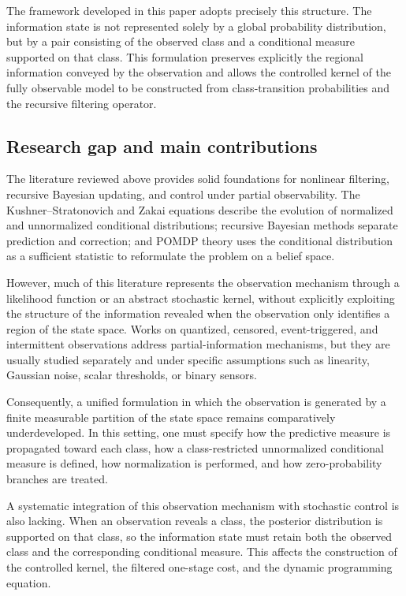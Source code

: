 \documentclass[10pt,twocolumn]{article}
\theoremstyle{remark}
\begin{document}
The framework developed in this paper adopts precisely this structure. The information state is not represented solely by a global probability distribution, but by a pair consisting of the observed class and a conditional measure supported on that class. This formulation preserves explicitly the regional information conveyed by the observation and allows the controlled kernel of the fully observable model to be constructed from class-transition probabilities and the recursive filtering operator. 

\subsection{Research gap and main contributions}

The literature reviewed above provides solid foundations for nonlinear filtering, recursive Bayesian updating, and control under partial observability. The Kushner--Stratonovich and Zakai equations describe the evolution of normalized and unnormalized conditional distributions; recursive Bayesian methods separate prediction and correction; and POMDP theory uses the conditional distribution as a sufficient statistic to reformulate the problem on a belief space.

However, much of this literature represents the observation mechanism through a likelihood function or an abstract stochastic kernel, without explicitly exploiting the structure of the information revealed when the observation only identifies a region of the state space. Works on quantized, censored, event-triggered, and intermittent observations address partial-information mechanisms, but they are usually studied separately and under specific assumptions such as linearity, Gaussian noise, scalar thresholds, or binary sensors.

Consequently, a unified formulation in which the observation is generated by a finite measurable partition of the state space remains comparatively underdeveloped. In this setting, one must specify how the predictive measure is propagated toward each class, how a class-restricted unnormalized conditional measure is defined, how normalization is performed, and how zero-probability branches are treated.

A systematic integration of this observation mechanism with stochastic control is also lacking. When an observation reveals a class, the posterior distribution is supported on that class, so the information state must retain both the observed class and the corresponding conditional measure. This affects the construction of the controlled kernel, the filtered one-stage cost, and the dynamic programming equation.
\end{document}
